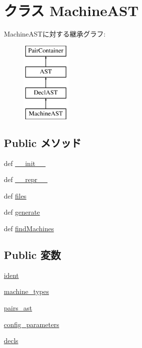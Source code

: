 \hypertarget{classslicc_1_1ast_1_1MachineAST_1_1MachineAST}{
\section{クラス MachineAST}
\label{classslicc_1_1ast_1_1MachineAST_1_1MachineAST}
}
MachineASTに対する継承グラフ:\begin{figure}[H]
\begin{center}
\leavevmode
\includegraphics[height=4cm]{classslicc_1_1ast_1_1MachineAST_1_1MachineAST}
\end{center}
\end{figure}
\subsection*{Public メソッド}
\begin{DoxyCompactItemize}
\item 
def \hyperlink{classslicc_1_1ast_1_1MachineAST_1_1MachineAST_ac775ee34451fdfa742b318538164070e}{\_\-\_\-init\_\-\_\-}
\item 
def \hyperlink{classslicc_1_1ast_1_1MachineAST_1_1MachineAST_ad8b9328939df072e4740cd9a63189744}{\_\-\_\-repr\_\-\_\-}
\item 
def \hyperlink{classslicc_1_1ast_1_1MachineAST_1_1MachineAST_a35b1a87f6fcbddeb5b793b0e415765f8}{files}
\item 
def \hyperlink{classslicc_1_1ast_1_1MachineAST_1_1MachineAST_a4555d1cee0dccf3942ea35fe86de2e8e}{generate}
\item 
def \hyperlink{classslicc_1_1ast_1_1MachineAST_1_1MachineAST_a716f8a2874cc6a4d0c5ed3c2f90f236d}{findMachines}
\end{DoxyCompactItemize}
\subsection*{Public 変数}
\begin{DoxyCompactItemize}
\item 
\hyperlink{classslicc_1_1ast_1_1MachineAST_1_1MachineAST_a2fe57e2d3d2cba9a3aeba2f629eaa78b}{ident}
\item 
\hyperlink{classslicc_1_1ast_1_1MachineAST_1_1MachineAST_a7aed9972fd1d3959ac661b100dba3bd8}{machine\_\-types}
\item 
\hyperlink{classslicc_1_1ast_1_1MachineAST_1_1MachineAST_a03baf6f181cc885912d671c3fcbfd7e3}{pairs\_\-ast}
\item 
\hyperlink{classslicc_1_1ast_1_1MachineAST_1_1MachineAST_ae063a2c5f7b248003e02898444bff038}{config\_\-parameters}
\item 
\hyperlink{classslicc_1_1ast_1_1MachineAST_1_1MachineAST_a0bfd0c6209d776dae593ee7c78d9aed8}{decls}
\end{DoxyCompactItemize}


